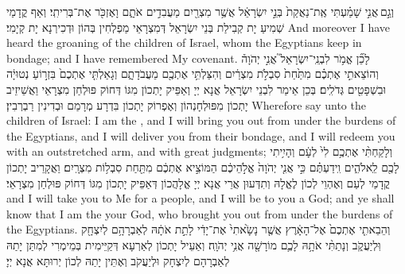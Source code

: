 {וְגַ֣ם \legarmeh  אֲנִ֣י שָׁמַ֗עְתִּי אֶֽת־נַאֲקַת֙ בְּנֵ֣י יִשְׂרָאֵ֔ל אֲשֶׁ֥ר מִצְרַ֖יִם מַעֲבִדִ֣ים אֹתָ֑ם וָאֶזְכֹּ֖ר אֶת־בְּרִיתִֽי׃
}
{וְאַף קֳדָמַי שְׁמִיעַ יָת קְבִילַת בְּנֵי יִשְׂרָאֵל דְּמִצְרָאֵי מַפְלְחִין בְּהוֹן וּדְכִירְנָא יָת קְיָמִי׃}
{And moreover I have heard the groaning of the children of Israel, whom the Egyptians keep in bondage; and I have remembered My covenant.}{}
{לָכֵ֞ן אֱמֹ֥ר לִבְנֵֽי־יִשְׂרָאֵל֮ אֲנִ֣י יְהֹוָה֒ וְהוֹצֵאתִ֣י אֶתְכֶ֗ם מִתַּ֙חַת֙ סִבְלֹ֣ת מִצְרַ֔יִם וְהִצַּלְתִּ֥י אֶתְכֶ֖ם מֵעֲבֹדָתָ֑ם וְגָאַלְתִּ֤י אֶתְכֶם֙ בִּזְר֣וֹעַ נְטוּיָ֔ה וּבִשְׁפָטִ֖ים גְּדֹלִֽים׃
}
{בְּכֵן אֵימַר לִבְנֵי יִשְׂרָאֵל אֲנָא יְיָ וְאַפֵּיק יָתְכוֹן מִגּוֹ דְּחוֹק פּוּלְחַן מִצְרָאֵי וַאֲשֵׁיזֵיב יָתְכוֹן מִפּוּלְחָנְהוֹן וְאֶפְרוֹק יָתְכוֹן בִּדְרָע מְרָמַם וּבְדִינִין רַבְרְבִין׃}
{Wherefore say unto the children of Israel: I am the \lord, and I will bring you out from under the burdens of the Egyptians, and I will deliver you from their bondage, and I will redeem you with an outstretched arm, and with great judgments;}{}
{וְלָקַחְתִּ֨י אֶתְכֶ֥ם לִי֙ לְעָ֔ם וְהָיִ֥יתִי לָכֶ֖ם לֵֽאלֹהִ֑ים וִֽידַעְתֶּ֗ם כִּ֣י אֲנִ֤י יְהֹוָה֙ אֱלֹ֣הֵיכֶ֔ם הַמּוֹצִ֣יא אֶתְכֶ֔ם מִתַּ֖חַת סִבְל֥וֹת מִצְרָֽיִם׃}
{וַאֲקָרֵיב יָתְכוֹן קֳדָמַי לְעַם וְאֶהְוֵי לְכוֹן לֶאֱלָהּ וְתִדְּעוּן אֲרֵי אֲנָא יְיָ אֱלָהֲכוֹן דְּאַפֵּיק יָתְכוֹן מִגּוֹ דְּחוֹק פּוּלְחַן מִצְרָאֵי׃}
{and I will take you to Me for a people, and I will be to you a God; and ye shall know that I am the \lord\space your God, who brought you out from under the burdens of the Egyptians.}{}
{וְהֵבֵאתִ֤י אֶתְכֶם֙ אֶל־הָאָ֔רֶץ אֲשֶׁ֤ר נָשָׂ֙אתִי֙ אֶת־יָדִ֔י לָתֵ֣ת אֹתָ֔הּ לְאַבְרָהָ֥ם לְיִצְחָ֖ק וּֽלְיַעֲקֹ֑ב וְנָתַתִּ֨י אֹתָ֥הּ לָכֶ֛ם מוֹרָשָׁ֖ה אֲנִ֥י יְהֹוָֽה׃
}
{וְאַעֵיל יָתְכוֹן לְאַרְעָא דְּקַיֵּימִית בְּמֵימְרִי לְמִתַּן יָתַהּ לְאַבְרָהָם לְיִצְחָק וּלְיַעֲקֹב וְאֶתֵּין יָתַהּ לְכוֹן יְרוּתָּא אֲנָא יְיָ׃}
